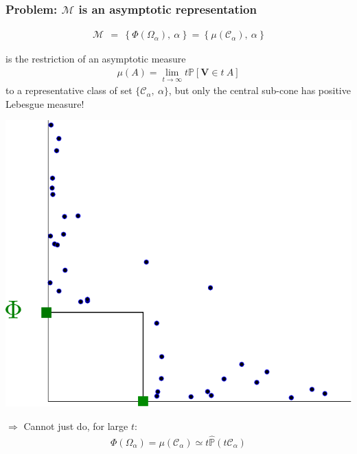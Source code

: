 \documentclass[10pt]{beamer}
\def\mb{\mathbf}
\begin{document}
\begin{frame}
\frametitle{Problem: $\mathcal{M}$ is an \textbf{asymptotic} representation}

\begin{align*}
\mathcal{M} ~~=~~ \big\{~\Phi(\Omega_{\alpha}),~ \alpha~\big\} ~=~ \big\{~\mu(\mathcal{C}_{\alpha}),~ \alpha~\big\}
\end{align*}

is the restriction of an asymptotic measure 
\begin{align*}
\mu(A)=\lim_{t \to \infty} t \mathbb{P}[\mb V\in t~A]
\end{align*}
to a representative class of set $\{\mathcal{C}_\alpha,~\alpha\}$, but only the central sub-cone has positive Lebesgue measure!

\begin{minipage}{0.5\linewidth}
\centering
\includegraphics[scale=0.3]{sourcefigs/representation2D_problem}
\end{minipage}\hfill
\begin{minipage}{0.5\linewidth}
$\Rightarrow$ Cannot just do, for large $t$:
\begin{align*}
\Phi(\Omega_\alpha) = \mu(\mathcal{C}_\alpha) \simeq t \widehat{\mathbb{P}}(t \mathcal{C}_\alpha)
\end{align*}
\end{minipage}

\end{frame}
\end{document}
